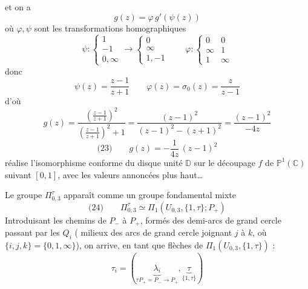 \documentclass[11pt,a4paper]{article}
\begin{document}
et on a
\[
  g(z) = \varphi\, g'(\psi(z))
\]
où $\varphi, \psi$ sont les transformations homographiques
\[
  \psi : \left\{
  \begin{array}{l} 1 \\ -1 \\ 0, \infty \end{array}
  \right.
  \longrightarrow
  \left\{
  \begin{array}{l} 0 \\ \infty \\ 1, -1 \end{array}
  \right.
  \qquad
  \varphi : \left\{
  \begin{array}{ll} 0 & 0 \\ \infty & 1 \\ 1 & \infty \end{array}
  \right.
\]
donc
\[
  \psi(z) = \frac{z-1}{z+1} \qquad
  \varphi(z) = \sigma_0(z) = \frac{z}{z-1}
\]
d'où
\[
  g(z) = \frac{\left(\frac{z-1}{z+1}\right)^2}
              {\left(\frac{z-1}{z+1}\right)^2 + 1}
       = \frac{(z-1)^2}{(z-1)^2 - (z+1)^2}
       = \frac{(z-1)^2}{-4z}
\]
\[
  \text{(23)} \qquad g(z) = -\frac{1}{4z}\,(z-1)^2
\]
réalise l'isomorphisme conforme du disque unité $\mathbb{D}$ sur le découpage
$f$ de $\mathbb{P}^1(\mathbb{C})$ suivant $[0, 1]$, avec les valeurs annoncées
plus haut…


Le groupe $\Pi_{0,3}^\tau$ apparaît comme un groupe fondamental mixte
\[
  \text{(24)} \qquad \Pi_{0,3}^\tau \simeq
  \Pi_1(U_{0,3}, \{1, \tau\}; P_+)
\]
Introduisant les chemins  de
$P_-$ à $P_+$, formés des demi-arcs de grand cercle passant par les $Q_i$
( milieux des arcs de grand cercle joignant $j$ à $k$, où
$\{i, j, k\} = \{0, 1, \infty\}$), on arrive, en tant que flèches de
$\Pi_1(U_{0,3}, \{1, \tau\})$ :
\[
  \tau_i = (\underbrace{\lambda_i}_{\tau P_+ = P_- \to P_+},
  \underbrace{\tau}_{\{1, \tau\}})
\]
\end{document}
